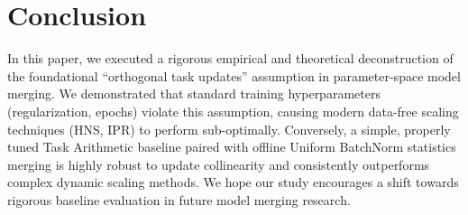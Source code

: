 \documentclass{article}
\theoremstyle{plain}
\theoremstyle{definition}
\theoremstyle{remark}
\begin{document}
\section{Conclusion}
\label{sec:conclusion}

In this paper, we executed a rigorous empirical and theoretical deconstruction of the foundational ``orthogonal task updates'' assumption in parameter-space model merging. We demonstrated that standard training hyperparameters (regularization, epochs) violate this assumption, causing modern data-free scaling techniques (HNS, IPR) to perform sub-optimally. Conversely, a simple, properly tuned Task Arithmetic baseline paired with offline Uniform BatchNorm statistics merging is highly robust to update collinearity and consistently outperforms complex dynamic scaling methods. We hope our study encourages a shift towards rigorous baseline evaluation in future model merging research.



\end{document}
